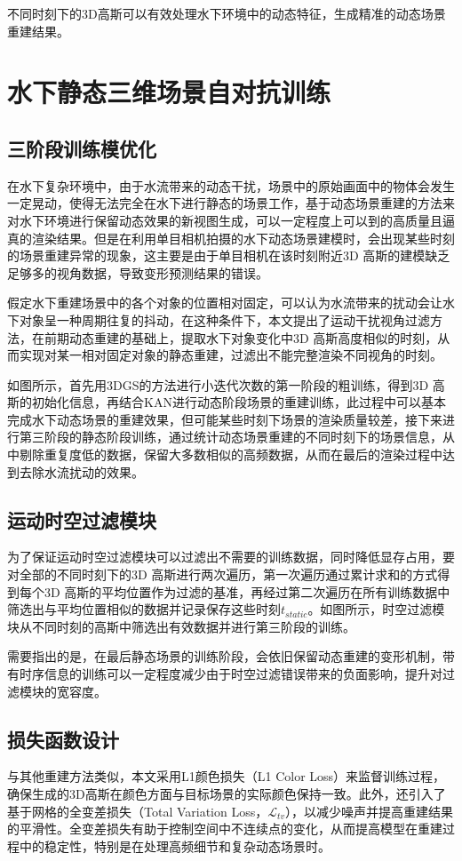 不同时刻下的3D高斯可以有效处理水下环境中的动态特征，生成精准的动态场景重建结果。

\section{水下静态三维场景自对抗训练}
\subsection{三阶段训练模优化}
在水下复杂环境中，由于水流带来的动态干扰，场景中的原始画面中的物体会发生一定晃动，使得无法完全在水下进行静态的场景工作，基于动态场景重建的方法来对水下环境进行保留动态效果的新视图生成，可以一定程度上可以到的高质量且逼真的渲染结果。但是在利用单目相机拍摄的水下动态场景建模时，会出现某些时刻的场景重建异常的现象，这主要是由于单目相机在该时刻附近3D 高斯的建模缺乏足够多的视角数据，导致变形预测结果的错误。

假定水下重建场景中的各个对象的位置相对固定，可以认为水流带来的扰动会让水下对象呈一种周期往复的抖动，在这种条件下，本文提出了运动干扰视角过滤方法，在前期动态重建的基础上，提取水下对象变化中3D 高斯高度相似的时刻，从而实现对某一相对固定对象的静态重建，过滤出不能完整渲染不同视角的时刻。

如图所示，首先用3DGS的方法进行小迭代次数的第一阶段的粗训练，得到3D 高斯的初始化信息，再结合KAN进行动态阶段场景的重建训练，此过程中可以基本完成水下动态场景的重建效果，但可能某些时刻下场景的渲染质量较差，接下来进行第三阶段的静态阶段训练，通过统计动态场景重建的不同时刻下的场景信息，从中剔除重复度低的数据，保留大多数相似的高频数据，从而在最后的渲染过程中达到去除水流扰动的效果。

\subsection{运动时空过滤模块}
为了保证运动时空过滤模块可以过滤出不需要的训练数据，同时降低显存占用，要对全部的不同时刻下的3D 高斯进行两次遍历，第一次遍历通过累计求和的方式得到每个3D 高斯的平均位置作为过滤的基准，再经过第二次遍历在所有训练数据中筛选出与平均位置相似的数据并记录保存这些时刻$t_{static}$。如图所示，时空过滤模块从不同时刻的高斯中筛选出有效数据并进行第三阶段的训练。

需要指出的是，在最后静态场景的训练阶段，会依旧保留动态重建的变形机制，带有时序信息的训练可以一定程度减少由于时空过滤错误带来的负面影响，提升对过滤模块的宽容度。

\subsection{损失函数设计}
与其他重建方法类似\cite{3DGS}，本文采用L1颜色损失（L1 Color Loss）来监督训练过程，确保生成的3D高斯在颜色方面与目标场景的实际颜色保持一致。此外，还引入了基于网格的全变差损失（Total Variation Loss，$\mathcal{L}_{tv}$）\cite{hex_plane}\cite{k-planes}，以减少噪声并提高重建结果的平滑性。全变差损失有助于控制空间中不连续点的变化，从而提高模型在重建过程中的稳定性，特别是在处理高频细节和复杂动态场景时。

